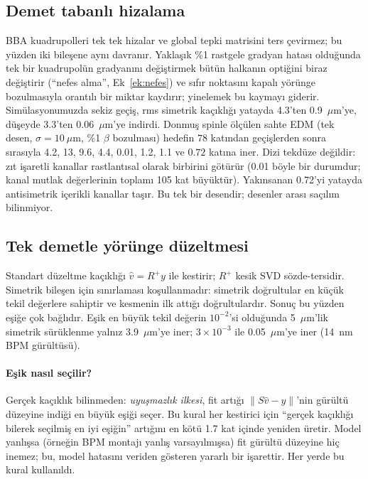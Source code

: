 \documentclass[12pt,a4paper]{extarticle}
\begin{document}
\subsection{Demet tabanlı hizalama}
BBA kuadrupolleri tek tek hizalar ve global tepki matrisini ters çevirmez; bu yüzden iki bileşene aynı
davranır. Yaklaşık \%1 rastgele gradyan hatası olduğunda tek bir kuadrupolün gradyanını değiştirmek bütün
halkanın optiğini biraz değiştirir (``nefes alma'', Ek~\ref{ek:nefes}) ve sıfır noktasını kapalı yörünge
bozulmasıyla orantılı bir miktar kaydırır; yinelemek bu kaymayı giderir. Simülasyonumuzda sekiz geçiş, rms
simetrik kaçıklığı yatayda 4.3'ten 0.9~$\mu$m'ye, düşeyde 3.3'ten 0.06~$\mu$m'ye indirdi. Donmuş spinle
ölçülen sahte EDM (tek desen, $\sigma=10~\mu$m, \%1 $\beta$ bozulması) hedefin $78$ katından geçişlerden sonra
sırasıyla 4.2, 13, 9.6, 4.4, 0.01, 1.2, 1.1 ve $0.72$ katına iner. Dizi tekdüze değildir: zıt işaretli kanallar
rastlantısal olarak birbirini götürür (0.01 böyle bir durumdur; kanal mutlak değerlerinin toplamı 105 kat
büyüktür). Yakınsanan 0.72'yi yatayda antisimetrik içerikli kanallar taşır. Bu tek bir desendir; desenler
arası saçılım bilinmiyor.

\subsection{Tek demetle yörünge düzeltmesi}\label{sec:tekdemet}
Standart düzeltme kaçıklığı $\hat v=R^+y$ ile kestirir; $R^+$ kesik SVD sözde-tersidir. Simetrik bileşen için
sınırlaması koşullanmadır: simetrik doğrultular en küçük tekil değerlere sahiptir ve kesmenin ilk attığı
doğrultulardır. Sonuç bu yüzden eşiğe çok bağlıdır. Eşik en büyük tekil değerin $10^{-2}$'si olduğunda
5~$\mu$m'lik simetrik sürüklenme yalnız 3.9~$\mu$m'ye iner; $3\times10^{-3}$ ile 0.05~$\mu$m'ye iner (14~nm BPM
gürültüsü).

\paragraph{Eşik nasıl seçilir?} Gerçek kaçıklık bilinmeden: \emph{uyuşmazlık ilkesi}, fit artığı
$\|S\hat v-y\|$'nin gürültü düzeyine indiği en büyük eşiği seçer. Bu kural her kestirici için ``gerçek
kaçıklığı bilerek seçilmiş en iyi eşiğin'' artığını en kötü 1.7 kat içinde yeniden üretir. Model yanlışsa
(örneğin BPM montajı yanlış varsayılmışsa) fit gürültü düzeyine hiç inemez; bu, model hatasını veriden
gösteren yararlı bir işarettir. Her yerde bu kural kullanıldı.
\end{document}
